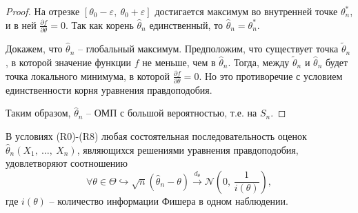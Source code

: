 \begin{proof}
    
    
    
    На отрезке $\displaystyle [ \theta _{0} -\varepsilon ,\ \theta _{0} +\varepsilon ]$ достигается максимум во внутренней точке $\displaystyle \theta _{n}^{*}$, и в ней $\displaystyle \frac{\partial f}{\partial \theta } =0$. Так как корень $\displaystyle \hat{\theta }_{n}$ единственный, то $\displaystyle \hat{\theta }_{n} =\theta _{n}^{*}$.
    
    Докажем, что $\displaystyle \hat{\theta }_{n}$ -- глобальный максимум. Предположим, что существует точка $\displaystyle \tilde{\theta }_{n}$, в которой значение функции $\displaystyle f$ не меньше, чем в $\displaystyle \hat{\theta }_{n}$. Тогда, между $\displaystyle \tilde{\theta }_{n}$ и $\displaystyle \hat{\theta }_{n}$ будет точка локального минимума, в которой $\displaystyle \frac{\partial f}{\partial \theta } =0$. Но это противоречие с условием единственности корня уравнения правдоподобия.
    
    Таким образом, $\displaystyle \hat{\theta }_{n}$ -- ОМП с большой вероятностью, т.е. на $\displaystyle S_{n}$.
\end{proof}
\begin{theorem}
    В условиях (R0)-(R8) любая состоятельная последовательность оценок $\displaystyle \hat{\theta }_{n}( X_{1} ,\ \dotsc ,\ X_{n})$, являющихся решениями уравнения правдоподобия, удовлетворяют соотношению
    \begin{equation*}
        \forall \theta \in \Theta \hookrightarrow \sqrt{n}(\hat{\theta }_{n} -\theta )\xrightarrow{d_{\theta }}\mathcal{N}\left( 0,\, \dfrac{1}{i( \theta )}\right) ,
    \end{equation*}
    где $\displaystyle i( \theta )$ -- количество информации Фишера в одном наблюдении.
\end{theorem}
